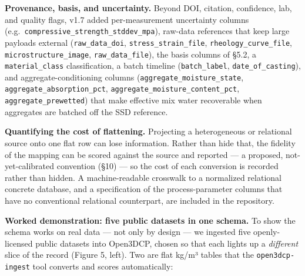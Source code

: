 \documentclass[
  11pt,
  letterpaper,
]{article}
\begin{document}
\textbf{Provenance, basis, and uncertainty.} Beyond DOI, citation,
confidence, lab, and quality flags, v1.7 added per-measurement
uncertainty columns (e.g.~\texttt{compressive\_strength\_stddev\_mpa}),
raw-data references that keep large payloads external
(\texttt{raw\_data\_doi}, \texttt{stress\_strain\_file},
\texttt{rheology\_curve\_file}, \texttt{microstructure\_image},
\texttt{raw\_data\_file}), the basis columns of §5.2, a
\texttt{material\_class} classification, a batch timeline
(\texttt{batch\_label}, \texttt{date\_of\_casting}), and
aggregate-conditioning columns (\texttt{aggregate\_moisture\_state},
\texttt{aggregate\_absorption\_pct},
\texttt{aggregate\_moisture\_content\_pct},
\texttt{aggregate\_prewetted}) that make effective mix water recoverable
when aggregates are batched off the SSD reference.

\textbf{Quantifying the cost of flattening.} Projecting a heterogeneous
or relational source onto one flat row can lose information. Rather than
hide that, the fidelity of the mapping can be scored against the source
and reported --- a proposed, not-yet-calibrated convention (§10) --- so
the cost of each conversion is recorded rather than hidden. A
machine-readable crosswalk to a normalized relational concrete database,
and a specification of the process-parameter columns that have no
conventional relational counterpart, are included in the repository.

\textbf{Worked demonstration: five public datasets in one schema.} To
show the schema works on real data --- not only by design --- we
ingested five openly-licensed public datasets into Open3DCP, chosen so
that each lights up a \emph{different} slice of the record (Figure 5,
left). Two are flat kg/m³ tables that the \texttt{open3dcp-ingest} tool
converts and scores automatically:
\end{document}

